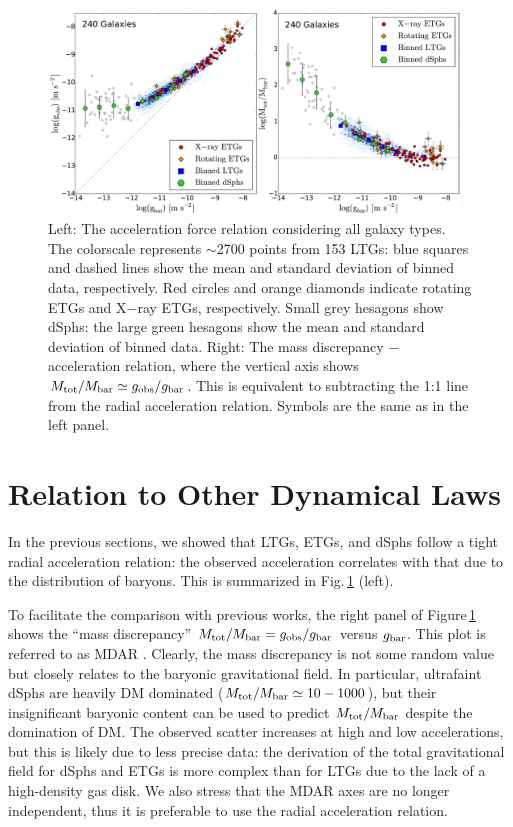 \documentclass[apjl, twocolappendix]{emulateapj}
\begin{document}
\begin{figure}[thb]
\centering
\includegraphics[width=0.975\textwidth]{RAR_Todo.pdf}
\caption{Left: The acceleration force relation considering all galaxy types. The colorscale represents $\sim$2700 points from 153 LTGs: blue squares and dashed lines show the mean and standard deviation of binned data, respectively. Red circles and orange diamonds indicate rotating ETGs and X$-$ray ETGs, respectively. Small grey hesagons show dSphs: the large green hesagons show the mean and standard deviation of binned data. Right: The mass discrepancy $-$ acceleration relation, where the vertical axis shows $M_{\rm tot}/M_{\rm bar} \simeq g_{\rm obs}/g_{\rm bar}$. This is equivalent to subtracting the 1:1 line from the radial acceleration relation. Symbols are the same as in the left panel.}
\label{fig:Todo}
\end{figure}
\section{Relation to Other Dynamical Laws}\label{sec:Other}

In the previous sections, we showed that LTGs, ETGs, and dSphs follow a tight radial acceleration relation: the observed acceleration correlates with that due to the distribution of baryons. This is summarized in Fig.\,\ref{fig:Todo} (left). 

To facilitate the comparison with previous works, the right panel of Figure\,\ref{fig:Todo} shows the ``mass discrepancy'' $M_{\rm tot}/M_{\rm bar} = g_{\rm obs}/g_{\rm bar}$ versus $g_{\rm bar}$. This plot is referred to as MDAR \citep{McGaugh2004, McGaugh2014}. Clearly, the mass discrepancy is not some random value but closely relates to the baryonic gravitational field. In particular, ultrafaint dSphs are heavily DM dominated ($M_{\rm tot}/M_{\rm bar}\simeq10-1000$), but their insignificant baryonic content can be used to predict $M_{\rm tot}/M_{\rm bar}$ despite the domination of DM. The observed scatter increases at high and low accelerations, but this is likely due to less precise data: the derivation of the total gravitational field for dSphs and ETGs is more complex than for LTGs due to the lack of a high-density gas disk. We also stress that the MDAR axes are no longer independent, thus it is preferable to use the radial acceleration relation.
\end{document}
